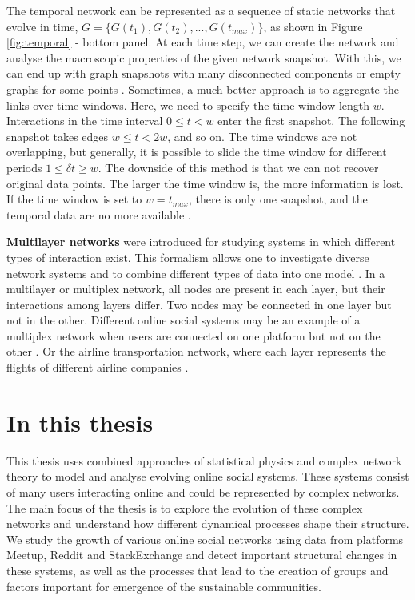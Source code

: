 The temporal network can be represented as a sequence of static networks that evolve in time, $G = \{ G(t_1), G(t_2), ..., G(t_{max})\}$, as shown in Figure \ref{fig:temporal} - bottom panel. At each time step, we can create the network and analyse the macroscopic properties of the given network snapshot. With this, we can end up with graph snapshots with many disconnected components or empty graphs for some points \cite{holme2015modern}. Sometimes, a much better approach is to aggregate the links over time windows. Here, we need to specify the time window length $w$. Interactions in the time interval $0\leq t<w$ enter the first snapshot. The following snapshot takes edges $w \leq t <2w$, and so on. The time windows are not overlapping, but generally, it is possible to slide the time window for different periods $ 1 \leq \delta t \geq w$. The downside of this method is that we can not recover original data points. The larger the time window is, the more information is lost. If the time window is set to $w=t_{max}$, there is only one snapshot, and the temporal data are no more available \cite{krings2012effects, arnold2021moving}. 

\textbf{Multilayer networks} were introduced for studying systems in which different types of interaction exist. This formalism allows one to investigate diverse network systems and to combine different types of data into one model \cite{porter2018multilayer}. In a multilayer or multiplex network, all nodes are present in each layer, but their interactions among layers differ. Two nodes may be connected in one layer but not in the other. Different online social systems may be an example of a multiplex network when users are connected on one platform but not on the other \cite{aleta2019multilayer}. Or the airline transportation network, where each layer represents the flights of different airline companies \cite{kivelamultilayer}.  


\section{In this thesis}

This thesis uses combined approaches of statistical physics and complex network theory to model and analyse evolving online social systems. These systems consist of many users interacting online and could be represented by complex networks.  The main focus of the thesis is to explore the evolution of these complex networks and understand how different dynamical processes shape their structure. We study the growth of various online social networks using data from platforms Meetup, Reddit and StackExchange and detect important structural changes in these systems, as well as the processes that lead to the creation of groups and factors important for emergence of the sustainable communities.


